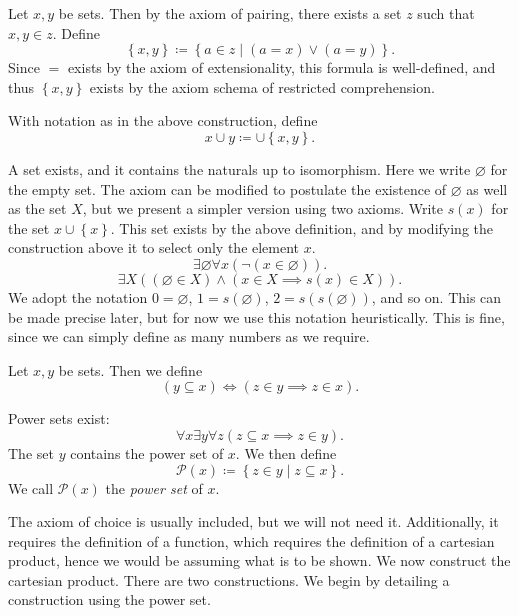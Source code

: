 \begin{construction}
	Let $x,y$ be sets. Then by the axiom of pairing, there exists a set $z$ such that $x,y\in z$. Define
	\[
		\left\{ x,y \right\} \coloneqq \left\{ a\in z\mid (a=x)\lor (a=y) \right\} 
	.\]
	Since $=$ exists by the axiom of extensionality, this formula is well-defined, and thus $\left\{ x,y \right\} $ exists by the axiom schema of restricted comprehension.
\end{construction}
\begin{definition}\label{dfn:union-pair}
	With notation as in the above construction, define
	\[
		x\cup y \coloneqq \cup \left\{ x,y \right\} 
	.\]
\end{definition}

\begin{axiom}[Infnity]
	A set exists, and it contains the naturals up to isomorphism. Here we write $\varnothing $ for the empty set. The axiom can be modified to postulate the existence of $\varnothing $ as well as the set $X$, but we present a simpler version using two axioms. Write $s(x)$ for the set $x\cup \left\{ x \right\} $. This set exists by the above definition, and by modifying the construction above it to select only the element $x$.
	\[
		\exists \varnothing \forall x(\neg(x\in \varnothing ))
	.\]
	\[
		\exists X\left( (\varnothing \in X)\land (x\in X \implies s(x)\in X) \right) 
	.\]
	We adopt the notation $0=\varnothing $, $1=s(\varnothing )$, $2=s(s(\varnothing ))$, and so on. This can be made precise later, but for now we use this notation heuristically. This is fine, since we can simply define as many numbers as we require.
\end{axiom}
\begin{definition}[Subset]\label{dfn:subset}
	Let $x,y$ be sets. Then we define
	\[
		(y\subseteq x) \iff (z\in y \implies z\in x)
	.\]
\end{definition}
\begin{axiom}
	Power sets exist:
	\[
		\forall x\exists y \forall z(z \subseteq x \implies z\in y)
	.\]
	The set $y$ contains the power set of $x$. We then define
	\[
		\mathcal{P} (x) \coloneqq \left\{ z\in y \mid z\subseteq x \right\} 
	.\]
	We call $\mathcal{P} (x)$ the \emph{power set} of $x$.
\end{axiom}

The axiom of choice is usually included, but we will not need it. Additionally, it requires the definition of a function, which requires the definition of a cartesian product, hence we would be assuming what is to be shown. We now construct the cartesian product. There are two constructions. We begin by detailing a construction using the power set.

